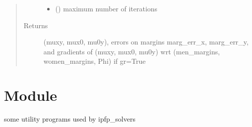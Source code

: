 \documentclass[letterpaper,10pt,english]{sphinxmanual}
\begin{document}
\begin{fulllineitems}
\begin{quote}
\begin{description}
\begin{itemize}
\item {} 
 () \textendash{} maximum number of iterations

\end{itemize}

\item[{Returns}] \leavevmode
(muxy, mux0, mu0y), errors on margins marg\_err\_x, marg\_err\_y,
and gradients of (muxy, mux0, mu0y)
wrt (men\_margins, women\_margins, Phi) if gr=True

\end{description}\end{quote}

\end{fulllineitems}



\chapter{Module }
\label{\detokenize{ipfp_utils:module-ipfp_utils}}\label{\detokenize{ipfp_utils:module-ipfp-utils}}\label{\detokenize{ipfp_utils::doc}}
some utility programs used by ipfp\_solvers
\end{document}
